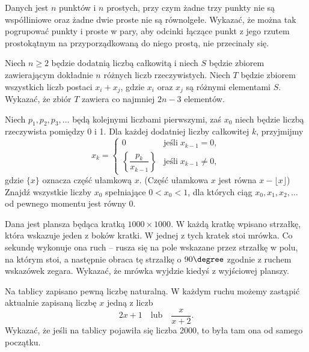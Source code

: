 \begin{problem}{1}
	Danych jest $n$ punktów i $n$ prostych, przy czym żadne trzy punkty nie są współliniowe oraz żadne dwie proste nie są równolgełe. Wykazać, że można tak pogrupować punkty i proste w pary, aby odcinki łączące punkt z jego rzutem prostokątnym na przyporządkowaną do niego prostą, nie przecinały się.
\end{problem}

\begin{problem}{2}
	Niech $n \geqslant 2$ będzie dodatnią liczbą całkowitą i niech $S$ będzie zbiorem zawierającym dokładnie $n$ różnych liczb rzeczywistych. Niech $T$ będzie zbiorem wszystkich liczb postaci $x_i + x_j$, gdzie $x_i$ oraz $x_j$ są różnymi elementami $S$. Wykazać, że zbiór $T$ zawiera co najmniej $2n - 3$ elementów.
\end{problem}

\begin{problem}{3}
	Niech $p_1, p_2, p_3, \ldots$ będą kolejnymi liczbami pierwszymi, zaś $x_0$ niech będzie liczbą rzeczywista pomiędzy 0 i 1. Dla każdej dodatniej liczby całkowitej $k$, przyjmijmy
\[
	x_k = \begin{cases} 
	0 & \text{jeśli} \; x_{k-1} = 0, \\
	\left\{ \dfrac{p_k}{x_{k-1}} \right\} & \text{jeśli} \; x_{k-1} \neq 0, 
	\end{cases}  
\]
gdzie $\{x\}$ oznacza część ułamkową $x$. (Część ułamkowa $x$ jest równa $x - \lfloor x \rfloor$) Znajdź wszystkie liczby $x_0$ spełniające $0 < x_0 < 1$, dla których ciąg $x_0, x_1, x_2, \ldots$ od pewnego momentu jest równy 0.
\end{problem}

\begin{problem}{4}
	Dana jest plansza będąca kratką $1000\times 1000$. W każdą kratkę wpisano strzałkę, która wskazuje jeden z boków kratki. W jednej z tych kratek stoi mrówka. Co sekundę wykonuje ona ruch -- rusza się na pole wskazane przez strzałkę w polu, na którym stoi, a następnie obraca tę strzałkę o $90\degree$ zgodnie z ruchem wskazówek zegara. Wykazać, że mrówka wyjdzie kiedyś z wyjściowej planszy.
\end{problem}

\begin{problem}{5}
Na tablicy zapisano pewną liczbę naturalną. W każdym ruchu możemy zastąpić aktualnie zapisaną liczbę $x$ jedną z liczb 
\[
    2x + 1 \quad  \text{lub} \quad \dfrac{x}{x + 2}.
\]
Wykazać, że jeśli na tablicy pojawiła się liczba 2000, to była tam ona od samego początku.
\end{problem}


